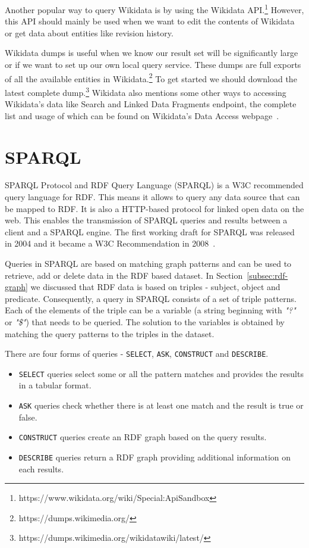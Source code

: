 Another popular way to query Wikidata is by using the Wikidata API.\footnote{https://www.wikidata.org/wiki/Special:ApiSandbox} However, this API should mainly be used when we want to edit the contents of Wikidata or get data about entities like revision history.

Wikidata dumps is useful when we know our result set will be significantly large or if we want to set up our own local query service. These dumps are full exports of all the available entities in Wikidata.\footnote{https://dumps.wikimedia.org/} To get started we should download the latest complete dump.\footnote{https://dumps.wikimedia.org/wikidatawiki/latest/} Wikidata also mentions some other ways to accessing Wikidata's data like Search and Linked Data Fragments endpoint, the complete list and usage of which can be found on Wikidata's Data Access webpage~\cite{Wikidata2022}.


\section{SPARQL}
SPARQL Protocol and RDF Query Language (SPARQL) is a W3C recommended query language for RDF. This means it allows to query any data source that can be mapped to RDF. It is also a HTTP-based protocol for linked open data on the web. This enables the transmission of SPARQL queries and results between a client and a SPARQL engine. The first working draft for SPARQL was released in 2004 and it became a W3C Recommendation in 2008~\cite{Perez2009}. 

Queries in SPARQL are based on matching graph patterns and can be used to retrieve, add or delete data in the RDF based dataset. In Section~\ref{subsec:rdf-graph} we discussed that RDF data is based on triples - subject, object and predicate. Consequently, a query in SPARQL consists of a set of triple patterns. Each of the elements of the triple can be a variable (a string beginning with \textit{"?"} or \textit{"\$"}) that needs to be queried. The solution to the variables is obtained by matching the query patterns to the triples in the dataset.

There are four forms of queries - \texttt{SELECT}, \texttt{ASK}, \texttt{CONSTRUCT} and \texttt{DESCRIBE}. 
\begin{itemize}
\item \texttt{SELECT} queries select some or all the pattern matches and provides the results in a tabular format.
\item \texttt{ASK} queries check whether there is at least one match and the result is true or false.
\item \texttt{CONSTRUCT} queries create an RDF graph based on the query results.
\item \texttt{DESCRIBE} queries return a RDF graph providing additional information on each results.
\end{itemize}

